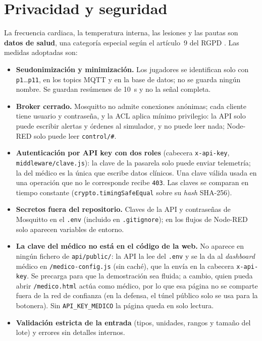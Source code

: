 \documentclass[runningheads]{llncs}
\newcommand{\topic}[1]{\texttt{#1}}
\newcommand{\ruta}[1]{\texttt{#1}}
\begin{document}
\section{Privacidad y seguridad}\label{sec:seguridad}

La frecuencia cardiaca, la temperatura interna, las lesiones y las pautas son \textbf{datos de salud}, una categoría especial según el artículo~9 del RGPD \cite{rgpd}. Las medidas adoptadas son:

\begin{itemize}
  \item \textbf{Seudonimización y minimización.} Los jugadores se identifican solo con \texttt{p1}\ldots\texttt{p11}, en los topics MQTT y en la base de datos; no se guarda ningún nombre. Se guardan resúmenes de 10~s y no la señal completa.
  \item \textbf{Broker cerrado.} Mosquitto no admite conexiones anónimas; cada cliente tiene usuario y contraseña, y la ACL aplica mínimo privilegio: la API solo puede escribir alertas y órdenes al simulador, y no puede leer nada; Node-RED solo puede leer \topic{control/\#}.
  \item \textbf{Autenticación por API key con dos roles} (cabecera \texttt{x-api-key}, \ruta{middleware/clave.js}): la clave de la pasarela solo puede enviar telemetría; la del médico es la única que escribe datos clínicos. Una clave válida usada en una operación que no le corresponde recibe \texttt{403}. Las claves se comparan en tiempo constante (\texttt{crypto.timingSafeEqual} sobre su \emph{hash} SHA-256).
  \item \textbf{Secretos fuera del repositorio.} Claves de la API y contraseñas de Mosquitto en el \texttt{.env} (incluido en \texttt{.gitignore}); en los flujos de Node-RED solo aparecen variables de entorno.
  \item \textbf{La clave del médico no está en el código de la web.} No aparece en ningún fichero de \ruta{api/public/}: la API la lee del \texttt{.env} y se la da al \emph{dashboard} médico en \ruta{/medico-config.js} (sin caché), que la envía en la cabecera \texttt{x-api-key}. Se precarga para que la demostración sea fluida; a cambio, quien pueda abrir \ruta{/medico.html} actúa como médico, por lo que esa página no se comparte fuera de la red de confianza (en la defensa, el túnel público solo se usa para la botonera). Sin \texttt{API\_KEY\_MEDICO} la página queda en solo lectura.
  \item \textbf{Validación estricta de la entrada} (tipos, unidades, rangos y tamaño del lote) y errores sin detalles internos.
\end{itemize}
\end{document}

